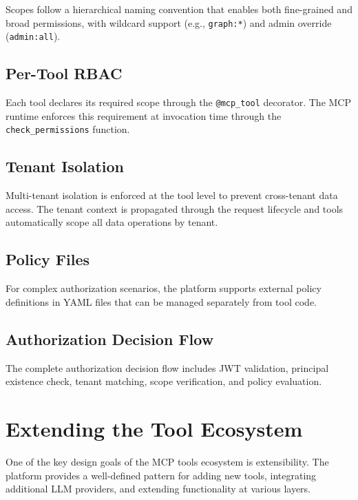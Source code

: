 \documentclass[a4paper,twoside]{sapthesis}
\begin{document}
Scopes follow a hierarchical naming convention that enables both fine-grained and broad permissions, with wildcard support (e.g., \texttt{graph:*}) and admin override (\texttt{admin:all}).

\subsection{Per-Tool RBAC}
\label{subsec:per-tool-rbac}

Each tool declares its required scope through the \texttt{@mcp\_tool} decorator. The MCP runtime enforces this requirement at invocation time through the \texttt{check\_permissions} function.

\subsection{Tenant Isolation}
\label{subsec:tenant-isolation}

Multi-tenant isolation is enforced at the tool level to prevent cross-tenant data access. The tenant context is propagated through the request lifecycle and tools automatically scope all data operations by tenant.

\subsection{Policy Files}
\label{subsec:policy-files}

For complex authorization scenarios, the platform supports external policy definitions in YAML files that can be managed separately from tool code.

\subsection{Authorization Decision Flow}
\label{subsec:auth-decision-flow}

The complete authorization decision flow includes JWT validation, principal existence check, tenant matching, scope verification, and policy evaluation.

\section{Extending the Tool Ecosystem}
\label{sec:tool-extension}

One of the key design goals of the MCP tools ecosystem is extensibility. The platform provides a well-defined pattern for adding new tools, integrating additional LLM providers, and extending functionality at various layers.
\end{document}
